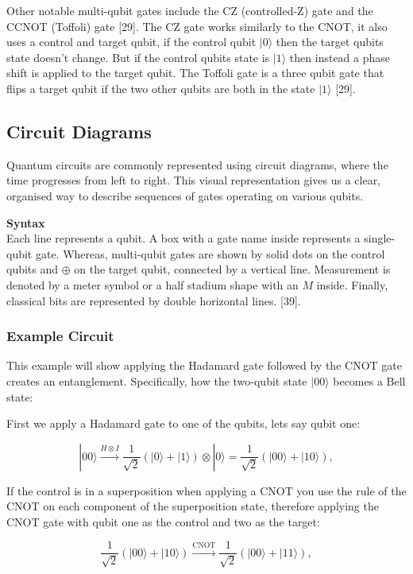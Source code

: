 \noindent Other notable multi-qubit gates include the CZ (controlled-Z) gate and the CCNOT (Toffoli) gate [29]. The CZ gate works similarly to the CNOT, it also uses a control and target qubit, if the control qubit $|0\rangle$ then the target qubits state doesn't change. But if the control qubits state is $|1\rangle$ then instead a phase shift is applied to the target qubit. The Toffoli gate is a three qubit gate that flips a target qubit if the two other qubits are both in the state $|1\rangle$ [29].


\subsection{Circuit Diagrams}

Quantum circuits are commonly represented using circuit diagrams, where the time progresses from left to right. This visual representation gives us a clear, organised way to describe sequences of gates operating on various qubits.

\noindent\textbf{Syntax} \\
\noindent Each line represents a qubit. A box with a gate name inside represents a single-qubit gate. Whereas, multi-qubit gates are shown by solid dots on the control qubits and $\oplus$ on the target qubit, connected by a vertical line. Measurement is denoted by a meter symbol or a half stadium shape with an $M$ inside. Finally, classical bits are represented by double horizontal lines. [39].

\subsubsection{Example Circuit}  
This example will show applying the Hadamard gate followed by the
CNOT gate creates an entanglement. Specifically, how the two-qubit state $|00\rangle$ becomes a Bell state:


\noindent First we apply a Hadamard gate to one of the qubits, lets say qubit one:

\[
|00\rangle \xrightarrow{H \otimes I} \frac{1}{\sqrt{2}} (|0\rangle + |1\rangle) \otimes |0\rangle
= \frac{1}{\sqrt{2}} (|00\rangle + |10\rangle),
\]

\noindent If the control is in a superposition when applying a CNOT you use the rule of the CNOT on each component of the superposition state, therefore applying the CNOT gate with qubit one as the control and two as the target:

\[
\frac{1}{\sqrt{2}} (|00\rangle + |10\rangle)\xrightarrow{\text{CNOT}} \frac{1}{\sqrt{2}} (|00\rangle + |11\rangle),
\]

